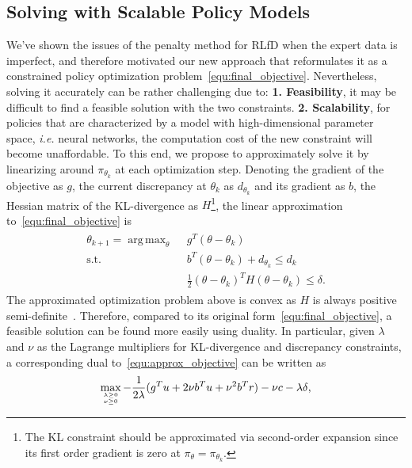 \documentclass[letterpaper]{article} %
\DeclareMathOperator*{\argmax}{arg\,max}
\begin{document}
\subsection{Solving with Scalable Policy Models}
We've shown the issues of the penalty method for RLfD when the expert data is imperfect, and therefore motivated our new approach that reformulates it as a constrained policy optimization problem~\eqref{equ:final_objective}. Nevertheless, solving it accurately can be rather challenging due to: \textbf{1. Feasibility}, it may be difficult to find a feasible solution with the two constraints. \textbf{2. Scalability}, for policies that are characterized by a model with high-dimensional parameter space, \emph{i.e.} neural networks, the computation cost of the new constraint will become unaffordable. To this end, we propose to approximately solve it by linearizing around $\pi_{\theta_k}$ at each optimization step. Denoting the gradient of the objective as $g$, the current discrepancy at $\theta_k $ as $d_{\theta_k} $ and its gradient as $b$, the Hessian matrix of the KL-divergence as $H$\footnote{The KL constraint should be approximated via second-order expansion since its first order gradient is zero at $\pi_\theta = \pi_{\theta_k}$.}, the linear approximation to~\eqref{equ:final_objective} is
\begin{align}
\begin{split}\label{equ:approx_objective}
    \theta_{k+1} = \argmax_\theta~~& g^{T}(\theta - \theta_k)\\
    \text{s.t.}~~& b^T(\theta - \theta_k) + d_{\theta_k} \leqslant d_k \\
    & \frac{1}{2}(\theta-\theta_k)^TH(\theta-\theta_k) \leqslant \delta\text{.}
\end{split}
\end{align}
The approximated optimization problem above is convex as $H$ is always positive semi-definite~\cite{trpo}. Therefore, compared to its original form~\eqref{equ:final_objective}, a feasible solution can be found more easily using duality.
In particular, given $\lambda$ and $\nu$ as the Lagrange multipliers for KL-divergence and discrepancy constraints, a corresponding dual to~\eqref{equ:approx_objective} can be written as
\begin{align}
\begin{split}\label{equ:dual}
    \max_{\lambda \geq 0 \atop \nu \geq 0} -\frac{1}{2\lambda}(g^T u + 2\nu b^T u + \nu^2 b^T r) - \nu c - \lambda\delta\text{,}
\end{split}
\end{align}
\end{document}
